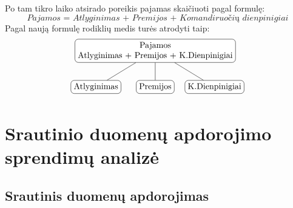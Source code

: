\documentclass{VUMIFPSbakalaurinis}
\begin{document}
\begin{itemize}
\[    \]\par
     Po tam tikro laiko atsirado poreikis pajamas skaičiuoti pagal formulę: \[\textit{Pajamos = Atlyginimas + Premijos + Komandiruočių dienpinigiai}\] Pagal naują formulę rodiklių medis turės atrodyti taip: 
     \[	
        \begin{tikzpicture}[sibling distance=7em,	
            every node/.style = {shape=rectangle, rounded corners,	
                                 draw, align=center,	
                                 top color=white, bottom color=white}]	
            \node {Pajamos\\Atlyginimas + Premijos + K.Dienpinigiai}	
                    child { node {Atlyginimas} }	
                    child { node {Premijos} } 
                    child { node {K.Dienpinigiai} };	
        \end{tikzpicture} 	
    \]
\end{itemize} 

\noindent 
\section{Srautinio duomenų apdorojimo sprendimų analizė}

\subsection{Srautinis duomenų apdorojimas} \label{strprocess}
\end{document}
